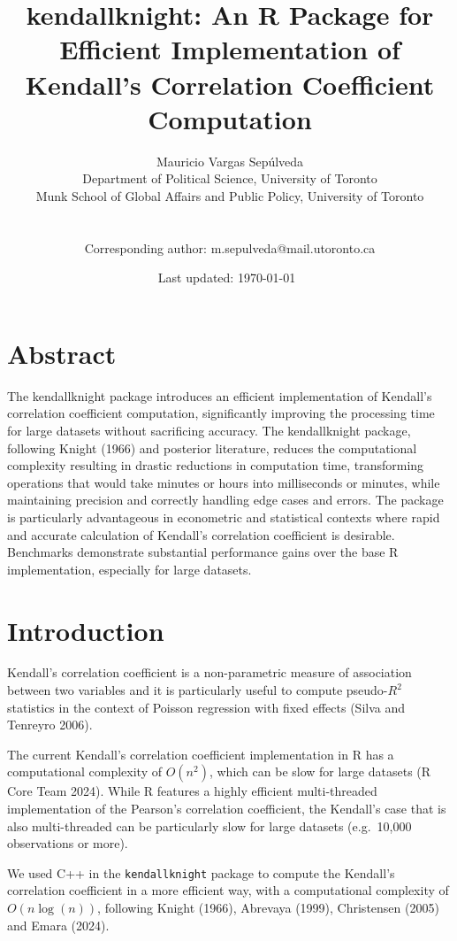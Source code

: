 \documentclass[12pt]{article}
\author{
  Mauricio Vargas Sepúlveda\\Department of Political Science, University
of Toronto\\Munk School of Global Affairs and Public Policy, University
of Toronto\\
  \smallskip\\
  \smallskip\\
  Corresponding author: m.sepulveda@mail.utoronto.ca
}
\title{kendallknight: An R Package for Efficient Implementation of
Kendall's Correlation Coefficient Computation}
\date{Last updated: \today\ \currenttime}
\begin{document}
\maketitle


\thispagestyle{empty}
\tableofcontents
\setcounter{page}{0}
\clearpage

\afterpage{\setlength\parskip{10pt}}

\section{Abstract}\label{abstract}

The kendallknight package introduces an efficient implementation of
Kendall's correlation coefficient computation, significantly improving
the processing time for large datasets without sacrificing accuracy. The
kendallknight package, following Knight (1966) and posterior literature,
reduces the computational complexity resulting in drastic reductions in
computation time, transforming operations that would take minutes or
hours into milliseconds or minutes, while maintaining precision and
correctly handling edge cases and errors. The package is particularly
advantageous in econometric and statistical contexts where rapid and
accurate calculation of Kendall's correlation coefficient is desirable.
Benchmarks demonstrate substantial performance gains over the base R
implementation, especially for large datasets.

\section{Introduction}\label{introduction}

Kendall's correlation coefficient is a non-parametric measure of
association between two variables and it is particularly useful to
compute pseudo-\(R^2\) statistics in the context of Poisson regression
with fixed effects (Silva and Tenreyro 2006).

The current Kendall's correlation coefficient implementation in R has a
computational complexity of \(O(n^2)\), which can be slow for large
datasets (R Core Team 2024). While R features a highly efficient
multi-threaded implementation of the Pearson's correlation coefficient,
the Kendall's case that is also multi-threaded can be particularly slow
for large datasets (e.g.~10,000 observations or more).

We used C++ in the \texttt{kendallknight} package to compute the
Kendall's correlation coefficient in a more efficient way, with a
computational complexity of \(O(n \log(n))\), following Knight (1966),
Abrevaya (1999), Christensen (2005) and Emara (2024).
\end{document}
